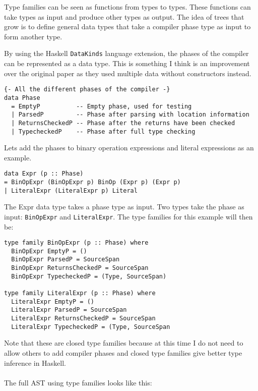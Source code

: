 \documentclass{report}
\begin{document}
Type families \cite{GHCTypeFamilies} can be seen as functions from types to types. These functions can take types as input and produce other types as output. The idea of trees that grow is to define general data types that take a compiler phase type as input to form another type.

By using the Haskell \texttt{DataKinds} language extension, the phases of the compiler can be represented as a data type. This is something I think is an improvement over the original paper as they used multiple data without constructors instead.

\begin{verbatim}
{- All the different phases of the compiler -}
data Phase
  = EmptyP          -- Empty phase, used for testing
  | ParsedP         -- Phase after parsing with location information
  | ReturnsCheckedP -- Phase after the returns have been checked
  | TypecheckedP    -- Phase after full type checking
\end{verbatim}

\noindent Lets add the phases to binary operation expressions and literal expressions as an example.

\begin{verbatim}
data Expr (p :: Phase)
= BinOpExpr (BinOpExpr p) BinOp (Expr p) (Expr p)
| LiteralExpr (LiteralExpr p) Literal
\end{verbatim}

\noindent The Expr data type takes a phase type as input. Two types take the phase as input: \texttt{BinOpExpr} and \texttt{LiteralExpr}. The type families for this example will then be:

\begin{verbatim}
type family BinOpExpr (p :: Phase) where
  BinOpExpr EmptyP = ()
  BinOpExpr ParsedP = SourceSpan
  BinOpExpr ReturnsCheckedP = SourceSpan
  BinOpExpr TypecheckedP = (Type, SourceSpan)

type family LiteralExpr (p :: Phase) where
  LiteralExpr EmptyP = ()
  LiteralExpr ParsedP = SourceSpan
  LiteralExpr ReturnsCheckedP = SourceSpan
  LiteralExpr TypecheckedP = (Type, SourceSpan
\end{verbatim}

\noindent Note that these are closed type families because at this time I do not need to allow others to add compiler phases and closed type families give better type inference in Haskell. 
\\\\
The full AST using type families looks like this:
\end{document}
